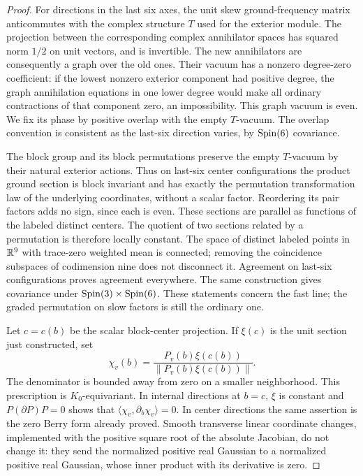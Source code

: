 \begin{proof}
For directions in the last six axes, the unit skew ground-frequency
matrix anticommutes with the complex structure $T$ used for the
exterior module. The projection between the corresponding complex
annihilator spaces has squared norm $1/2$ on unit vectors, and is
invertible. The new annihilators are consequently a graph over the
old ones. Their vacuum has a nonzero degree-zero coefficient: if the
lowest nonzero exterior component had positive degree, the graph
annihilation equations in one lower degree would make all ordinary
contractions of that component zero, an impossibility. This graph
vacuum is even. We fix its phase by positive overlap with the empty
$T$-vacuum. The overlap convention is consistent as the last-six
direction varies, by $\operatorname{Spin}(6)$ covariance.

The block group and its block permutations preserve the empty
$T$-vacuum by their natural exterior actions. Thus on last-six center
configurations the product ground section is block invariant and
has exactly the permutation transformation law of the underlying
coordinates, without a scalar factor. Reordering its pair factors
adds no sign, since each is even. These sections are parallel as
functions of the labeled distinct centers. The quotient of two
sections related by a permutation is therefore locally constant.
The space of distinct labeled points in $\mathbb R^9$ with trace-zero
weighted mean is connected; removing the coincidence subspaces of
codimension nine does not disconnect it. Agreement on last-six
configurations proves agreement everywhere. The same construction
gives covariance under $\operatorname{Spin}(3)\times\operatorname{Spin}(6)$. These statements
concern the fast line; the graded permutation on slow factors is
still the ordinary one.

Let $c=c(b)$ be the scalar block-center projection. If $\xi(c)$ is
the unit section just constructed, set
\begin{equation}
 \chi_v(b)=\frac{P_v(b)\xi(c(b))}
                     {\|P_v(b)\xi(c(b))\|}.
 \label{fast:section-choice}
\end{equation}
The denominator is bounded away from zero on a smaller neighborhood.
This prescription is $K_0$-equivariant. In internal directions at
$b=c$, $\xi$ is constant and $P(\partial P)P=0$ shows that
$\langle\chi_v,\partial_b\chi_v\rangle=0$. In center directions the
same assertion is the zero Berry form already proved. Smooth
transverse linear coordinate changes, implemented with the positive
square root of the absolute Jacobian, do not change it: they send
the normalized positive real Gaussian to a normalized positive real
Gaussian, whose inner product with its derivative is zero.
\end{proof}

